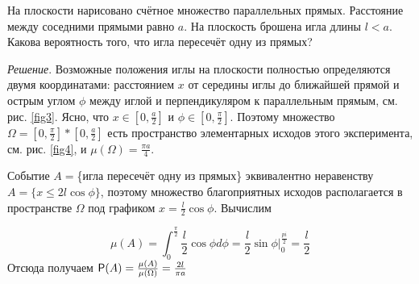 \begin{example}
	\label{ex:4.21}
На плоскости нарисовано счётное множество параллельных прямых. Расстояние между соседними прямыми равно $a$. На плоскость брошена игла длины $l < a$. Какова вероятность
того, что игла пересечёт одну из прямых?

\textit{Решение}. Возможные положения иглы на плоскости полностью определяются двумя координатами: расстоянием $x$ от середины иглы до ближайшей прямой и острым углом $\phi$ между иглой и перпендикуляром к параллельным прямым, см. рис. \ref{fig3}. Ясно, что $x \in [0, \frac{a}{2} ]$ и $\phi \in [0, \frac{\pi}{2} ]$. Поэтому множество $\Omega = [0, \frac{\pi}{2}] * [0, \frac{a}{2} ]$ есть пространство элементарных исходов этого эксперимента, см. рис. \ref{fig4}, и $\mu(\Omega) = \frac{\pi a}{4}$.

Событие $A =$\{игла пересечёт одну из прямых\} эквивалентно неравенству
$A = \{x \leq 2{{l}} \cos \phi \}$, поэтому множество благоприятных исходов располагается в пространстве $\Omega$ под графиком $x = \frac{ {{l}}}{2} \cos \phi$. Вычислим

$$\mu(A)=\int_{0}^{\frac{\pi}{2}} \frac{{{l}}}{2} \cos \phi d\phi = \frac{{{l}}}{2} \sin \phi \bigg|_0^{\frac{pi}{2}} = \frac{{{l}}}{2}$$
Отсюда получаем $\P(A) = \frac{\mu(A)}{\mu(\Omega)}
 = \frac{2{{l}}}{\pi a}$
\end{example}
